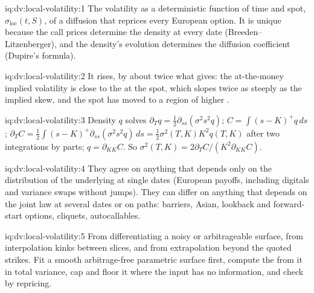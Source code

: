\begin{solution}{iq:dv:local-volatility:1}
The volatility as a deterministic function of time and spot, $\sigma_{\mathrm{loc}}(t,S)$, of a diffusion that
reprices every European option. It is unique because the call prices determine the density at every date
(Breeden--Litzenberger), and the density's evolution determines the diffusion coefficient (Dupire's formula).
\end{solution}

\begin{solution}{iq:dv:local-volatility:2}
It rises, by about twice what  gives: the at-the-money implied volatility is close to the  at the spot, which slopes twice as steeply as the implied skew, and the spot has moved to a region of
higher .
\end{solution}

\begin{solution}{iq:dv:local-volatility:3}
Density $q$ solves $\partial_Tq=\tfrac12\partial_{ss}(\sigma^2s^2q)$; $C=\int(s-K)^+q\,ds$; $\partial_TC=
\tfrac12\int(s-K)^+\partial_{ss}(\sigma^2s^2q)\,ds=\tfrac12\sigma^2(T,K)K^2q(T,K)$ after two integrations by parts;
$q=\partial_{KK}C$. So $\sigma^2(T,K)=2\partial_TC/(K^2\partial_{KK}C)$.
\end{solution}

\begin{solution}{iq:dv:local-volatility:4}
They agree on anything that depends only on the distribution of the underlying at single dates (European payoffs,
including digitals and variance swaps without jumps). They can differ on anything that depends on the joint law at
several dates or on paths: barriers, Asian, lookback and forward-start options, cliquets, autocallables.
\end{solution}

\begin{solution}{iq:dv:local-volatility:5}
From differentiating a noisy or arbitrageable surface, from interpolation kinks between slices, and from
extrapolation beyond the quoted strikes. Fit a smooth arbitrage-free parametric surface first, compute the  from it in total variance, cap and floor it where the input has no information, and check by repricing.
\end{solution}


